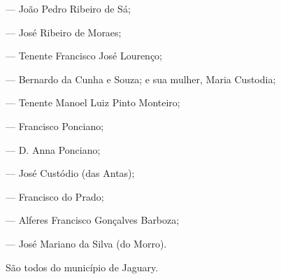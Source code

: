 --- João Pedro Ribeiro de Sá;

--- José Ribeiro de Moraes;

--- Tenente Francisco José Lourenço;

--- Bernardo da Cunha e Souza; e sua mulher, Maria Custodia;

--- Tenente Manoel Luiz Pinto Monteiro;

--- Francisco Ponciano;

--- D. Anna Ponciano;

--- José Custódio (das Antas);

--- Francisco do Prado;

--- Alferes Francisco Gonçalves Barboza;

--- José Mariano da Silva (do Morro).

São todos do município de Jaguary.

